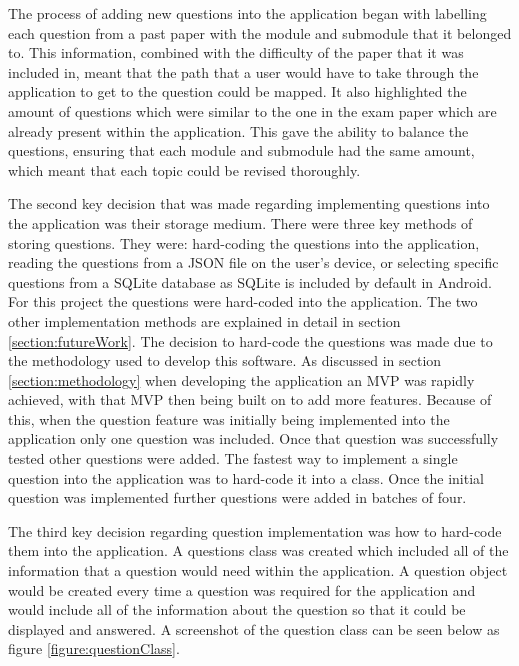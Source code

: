 \documentclass{article}
\begin{document}
The process of adding new questions into the application began with labelling each question from a past paper with the module and submodule that it belonged to. This information, combined with the difficulty of the paper that it was included in, meant that the path that a user would have to take through the application to get to the question could be mapped. It also highlighted the amount of questions which were similar to the one in the exam paper which are already present within the application. This gave the ability to balance the questions, ensuring that each module and submodule had the same amount, which meant that each topic could be revised thoroughly. \par

The second key decision that was made regarding implementing questions into the application was their storage medium. There were three key methods of storing questions. They were: hard-coding the questions into the application, reading the questions from a JSON file on the user's device, or selecting specific questions from a SQLite database as SQLite is included by default in Android. For this project the questions were hard-coded into the application. The two other implementation methods are explained in detail in section \ref{section:futureWork}. The decision to hard-code the questions was made due to the methodology used to develop this software. As discussed in section \ref{section:methodology} when developing the application an MVP was rapidly achieved, with that MVP then being built on to add more features. Because of this, when the question feature was initially being implemented into the application only one question was included. Once that question was successfully tested other questions were added. The fastest way to implement a single question into the application was to hard-code it into a class. Once the initial question was implemented further questions were added in batches of four. \par

The third key decision regarding question implementation was how to hard-code them into the application. A questions class was created which included all of the information that a question would need within the application. A question object would be created every time a question was required for the application and would include all of the information about the question so that it could be displayed and answered. A screenshot of the question class can be seen below as figure \ref{figure:questionClass}. 
\end{document}
